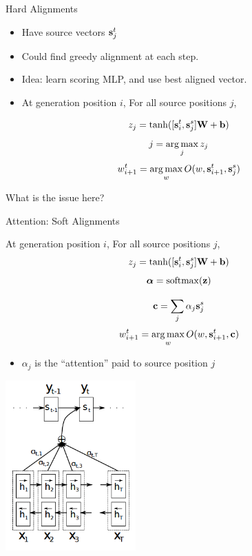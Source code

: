 \documentclass{beamer}
\begin{document}
\begin{frame}{Hard Alignments}
  \begin{itemize}
  \item Have source vectors $\mathbf{s}_j^t$ 

    \air
  \item Could find greedy alignment at each step.
    \air
  \item Idea: learn scoring MLP, and use best aligned vector. 

  \item   At generation position $i$, For all source positions $j$, 
  \end{itemize}

  \[ z_j = \tanh( [ \mathbf{s}^t_i,  \mathbf{s}^s_j ] \mathbf{W} + \mathbf{b})   \] 
  \[ j = \argmax_{j} z_j \]
  \[ w^t_{i+1} = \argmax_{w} O(w, \bolds^t_{i+1}, \bolds^s_j)  \] 

  What is the issue here?

\end{frame}



\begin{frame}{Attention: Soft Alignments}



  At generation position $i$, For all source positions $j$, 
  \[ z_j = \tanh( [ \mathbf{s}^t_i,  \mathbf{s}^s_j ] \mathbf{W} + \mathbf{b})   \] 
  \[ \balpha = \softmax(\boldz) \] 

  \[ \mathbf{c} = \sum_{j} \alpha_j \mathbf{s}^s_j \] 
  \[ w^t_{i+1} = \argmax_{w} O(w, \bolds^t_{i+1}, \boldc)  \] 
  \air 

  \begin{itemize}
  \item $\alpha_j$ is the ``attention'' paid to source position $j$
  \end{itemize}
\end{frame}


\begin{frame}
  \begin{center}
    \includegraphics[width=5cm]{attenstruct}
  \end{center}
\end{frame}
\end{document}
